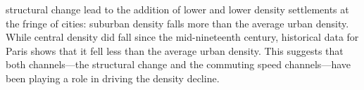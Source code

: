\documentclass[./20250130-paper.tex]{subfiles}
\begin{document}
structural change lead to the addition of lower and lower density settlements at the fringe of cities: suburban density falls more than the average urban density. While central density did fall since the mid-nineteenth century, historical data for Paris shows that it fell less than the average urban density. This suggests that both channels---the structural change and the commuting speed channels---have been playing a role in driving the density decline. 
	
	
	
	
	
\end{document}
